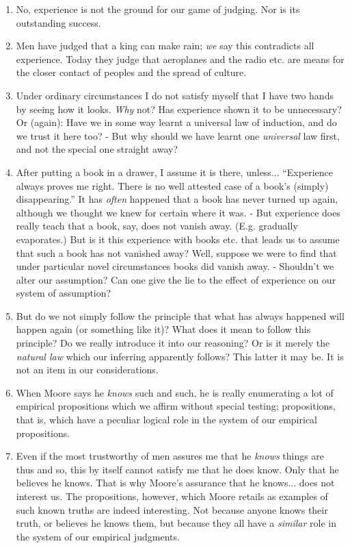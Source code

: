 \documentclass{book}
\begin{document}
\begin{enumerate}
\item
No, experience is not the ground for our game of judging. Nor is its
outstanding success.

\item
Men have judged that a king can make rain; \emph{we} say this contradicts all
experience. Today they judge that aeroplanes and the radio etc. are means for
the closer contact of peoples and the spread of culture.

\item
Under ordinary circumstances I do not satisfy myself that I have two hands by
seeing how it looks. \emph{Why} not? Has experience shown it to be unnecessary?
Or (again): Have we in some way learnt a universal law of induction, and do we
trust it here too? - But why should we have learnt one \emph{universal} law
first, and not the special one straight away?

\item
After putting a book in a drawer, I assume it is there, unless... ``Experience
always proves me right. There is no well attested case of a book's (simply)
disappearing.'' It has \emph{often} happened that a book has never turned up
again, although we thought we knew for certain where it was. - But experience
does really teach that a book, say, does not vanish away. (E.g. gradually
evaporates.) But is it this experience with books etc. that leads us to assume
that such a book has not vanished away? Well, suppose we were to find that
under particular novel circumstances books did vanish away. - Shouldn't we
alter our assumption? Can one give the lie to the effect of experience on our
system of assumption?

\item
But do we not simply follow the principle that what has always happened will
happen again (or something like it)? What does it mean to follow this
principle? Do we really introduce it into our reasoning? Or is it merely the
\emph{natural law} which our inferring apparently follows? This latter it may
be. It is not an item in our considerations.

\item
When Moore says he \emph{knows} such and such, he is really enumerating a lot
of empirical propositions which we affirm without special testing;
propositions, that is, which have a peculiar logical role in the system of our
empirical propositions.

\item
Even if the most trustworthy of men assures me that he \emph{knows} things are
thus and so, this by itself cannot satisfy me that he does know. Only that he
believes he knows. That is why Moore's assurance that he knows... does not
interest us. The propositions, however, which Moore retails as examples of such
known truths are indeed interesting. Not because anyone knows their truth, or
believes he knows them, but because they all have a \emph{similar} role in the
system of our empirical judgments.


\end{enumerate}
\end{document}
